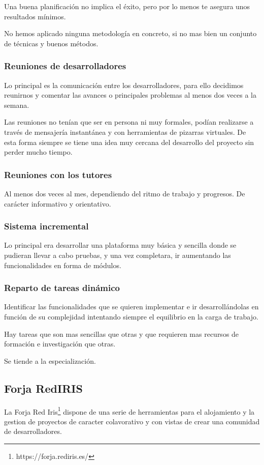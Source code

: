 Una buena planificación no implica el éxito, pero por lo menos te asegura unos
resultados mínimos.

No hemos aplicado ninguna metodología en concreto, si no mas bien un conjunto
de técnicas y buenos métodos.

\subsubsection*{Reuniones de desarrolladores}
Lo principal es la comunicación entre los desarrolladores, para ello decidimos
reunirnos y comentar las avances o principales problemas al menos dos veces a
la semana.

Las reuniones no tenían que ser en persona ni muy formales, podían realizarse a
través de mensajería instantánea y con herramientas de pizarras virtuales. De
esta forma siempre se tiene una idea muy cercana del desarrollo del proyecto sin
perder mucho tiempo.
\subsubsection*{Reuniones con los tutores}
Al menos dos veces al mes, dependiendo del ritmo de trabajo y progresos. De
carácter informativo y orientativo.

\subsubsection*{Sistema incremental}
Lo principal era desarrollar una plataforma muy básica y sencilla donde se
pudieran llevar a cabo pruebas, y una vez completara, ir aumentando las
funcionalidades en forma de módulos.

\subsubsection*{Reparto de tareas dinámico} %
Identificar las funcionalidades que se quieren implementar e ir
desarrollándolas en función de su complejidad intentando
siempre el equilibrio en la carga de trabajo.

Hay tareas que son mas sencillas que otras y que requieren mas recursos de
formación e investigación que otras.

Se tiende a la especialización.

\subsection*{Forja RedIRIS}
La Forja Red Iris\footnote{https://forja.rediris.es/} dispone de una serie de
herramientas para el alojamiento y la gestion de proyectos de caracter
colavorativo y con vistas de crear una comunidad de desarrolladores.

